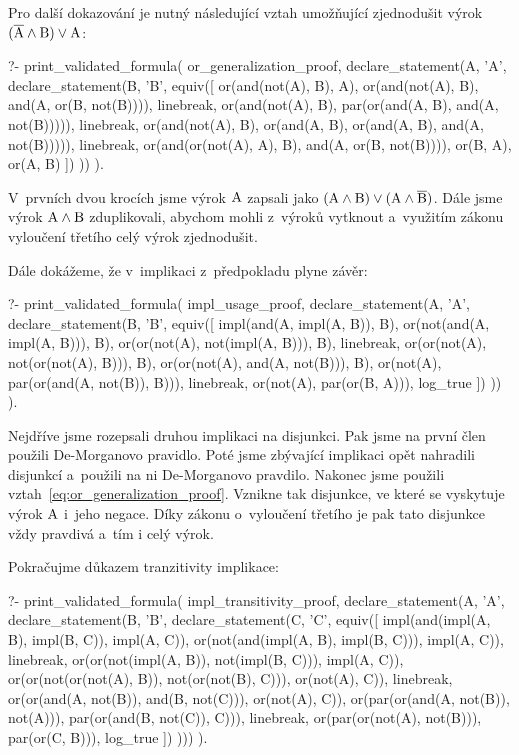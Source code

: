 Pro další dokazování je nutný následující vztah umožňující zjednodušit výrok \((\overline{\mathrm{A}} \land \mathrm{B}) \lor \mathrm{A}\):

\begin{prolog}
?- print_validated_formula(
	or_generalization_proof,
	declare_statement(A, 'A', declare_statement(B, 'B',
		equiv([
			or(and(not(A), B), A),
			or(and(not(A), B), and(A, or(B, not(B)))),
			linebreak,
			or(and(not(A), B), par(or(and(A, B), and(A, not(B))))),
			linebreak,
			or(and(not(A), B), or(and(A, B), or(and(A, B), and(A, not(B))))),
			linebreak,
			or(and(or(not(A), A), B), and(A, or(B, not(B)))),
			or(B, A),
			or(A, B)
		])
	))
).
\end{prolog}

V~prvních dvou krocích jsme výrok \(\mathrm{A}\) zapsali jako \((\mathrm{A} \land \mathrm{B}) \lor (\mathrm{A} \land \overline{\mathrm{B}})\). Dále jsme výrok \(\mathrm{A} \land \mathrm{B}\) zduplikovali, abychom mohli z~výroků vytknout a~využitím zákonu vyloučení třetího celý výrok zjednodušit.

Dále dokážeme, že v~implikaci z~předpokladu plyne závěr:

\begin{prolog}
?- print_validated_formula(
	impl_usage_proof,
	declare_statement(A, 'A', declare_statement(B, 'B',
		equiv([
			impl(and(A, impl(A, B)), B),
			or(not(and(A, impl(A, B))), B),
			or(or(not(A), not(impl(A, B))), B),
			linebreak,
			or(or(not(A), not(or(not(A), B))), B),
			or(or(not(A), and(A, not(B))), B),
			or(not(A), par(or(and(A, not(B)), B))),
			linebreak,
			or(not(A), par(or(B, A))),
			log_true
		])
	))
).
\end{prolog}

Nejdříve jsme rozepsali druhou implikaci na disjunkci. Pak jsme na první člen použili De-Morganovo pravidlo. Poté jsme zbývající implikaci opět nahradili disjunkcí a~použili na ni De-Morganovo pravdilo. Nakonec jsme použili vztah~\eqref{eq:or_generalization_proof}. Vznikne tak disjunkce, ve které se vyskytuje výrok 
\(\mathrm{A}\) i~jeho negace. Díky zákonu o~vyloučení třetího je pak tato disjunkce vždy pravdivá a~tím i celý výrok.

Pokračujme důkazem tranzitivity implikace:

\begin{prolog}
?- print_validated_formula(
	impl_transitivity_proof,
	declare_statement(A, 'A', declare_statement(B, 'B', declare_statement(C, 'C',
		equiv([
			impl(and(impl(A, B), impl(B, C)), impl(A, C)),
			or(not(and(impl(A, B), impl(B, C))), impl(A, C)),
			linebreak,
			or(or(not(impl(A, B)), not(impl(B, C))), impl(A, C)),
			or(or(not(or(not(A), B)), not(or(not(B), C))), or(not(A), C)),
			linebreak,
			or(or(and(A, not(B)), and(B, not(C))), or(not(A), C)),
			or(par(or(and(A, not(B)), not(A))), par(or(and(B, not(C)), C))),
			linebreak,
			or(par(or(not(A), not(B))), par(or(C, B))),
			log_true
		])
	)))
).
\end{prolog}

